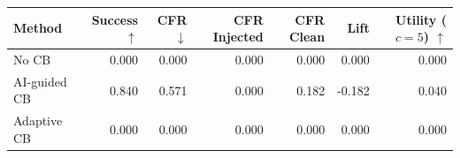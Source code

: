 \begin{tabular}{lrrrrrr}
\toprule
Method & Success $\uparrow$ & CFR $\downarrow$ & CFR Injected & CFR Clean & Lift & Utility ($c=5$) $\uparrow$ \\
\midrule
No CB & 0.000 & 0.000 & 0.000 & 0.000 & 0.000 & 0.000 \\
AI-guided CB & 0.840 & 0.571 & 0.000 & 0.182 & -0.182 & 0.040 \\
Adaptive CB & 0.000 & 0.000 & 0.000 & 0.000 & 0.000 & 0.000 \\
\bottomrule
\end{tabular}
